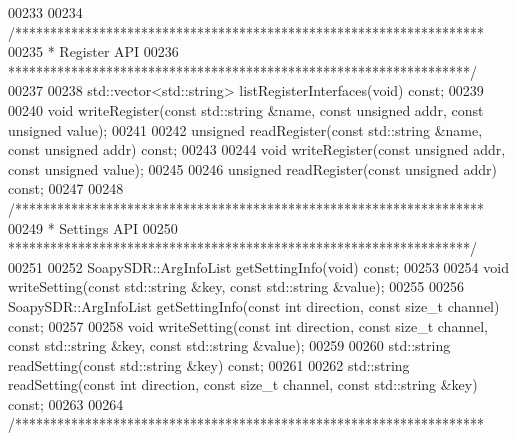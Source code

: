 \begin{DoxyCode}
00233 
00234     \textcolor{comment}{/*******************************************************************}
00235 \textcolor{comment}{     * Register API}
00236 \textcolor{comment}{     ******************************************************************/}
00237 
00238     std::vector<std::string> listRegisterInterfaces(\textcolor{keywordtype}{void}) \textcolor{keyword}{const};
00239 
00240     \textcolor{keywordtype}{void} writeRegister(\textcolor{keyword}{const} std::string &name, \textcolor{keyword}{const} \textcolor{keywordtype}{unsigned} addr, \textcolor{keyword}{const} \textcolor{keywordtype}{unsigned} value);
00241 
00242     \textcolor{keywordtype}{unsigned} readRegister(\textcolor{keyword}{const} std::string &name, \textcolor{keyword}{const} \textcolor{keywordtype}{unsigned} addr) \textcolor{keyword}{const};
00243 
00244     \textcolor{keywordtype}{void} writeRegister(\textcolor{keyword}{const} \textcolor{keywordtype}{unsigned} addr, \textcolor{keyword}{const} \textcolor{keywordtype}{unsigned} value);
00245 
00246     \textcolor{keywordtype}{unsigned} readRegister(\textcolor{keyword}{const} \textcolor{keywordtype}{unsigned} addr) \textcolor{keyword}{const};
00247 
00248     \textcolor{comment}{/*******************************************************************}
00249 \textcolor{comment}{     * Settings API}
00250 \textcolor{comment}{     ******************************************************************/}
00251 
00252     SoapySDR::ArgInfoList getSettingInfo(\textcolor{keywordtype}{void}) \textcolor{keyword}{const};
00253 
00254     \textcolor{keywordtype}{void} writeSetting(\textcolor{keyword}{const} std::string &key, \textcolor{keyword}{const} std::string &value);
00255 
00256     SoapySDR::ArgInfoList getSettingInfo(\textcolor{keyword}{const} \textcolor{keywordtype}{int} direction, \textcolor{keyword}{const} \textcolor{keywordtype}{size\_t} channel) \textcolor{keyword}{const};
00257 
00258     \textcolor{keywordtype}{void} writeSetting(\textcolor{keyword}{const} \textcolor{keywordtype}{int} direction, \textcolor{keyword}{const} \textcolor{keywordtype}{size\_t} channel, \textcolor{keyword}{const} std::string &key, \textcolor{keyword}{const} std::string 
      &value);
00259     
00260     std::string readSetting(\textcolor{keyword}{const} std::string &key) \textcolor{keyword}{const};
00261     
00262     std::string readSetting(\textcolor{keyword}{const} \textcolor{keywordtype}{int} direction, \textcolor{keyword}{const} \textcolor{keywordtype}{size\_t} channel, \textcolor{keyword}{const} std::string &key) \textcolor{keyword}{const};
00263 
00264     \textcolor{comment}{/*******************************************************************}

\end{DoxyCode}
